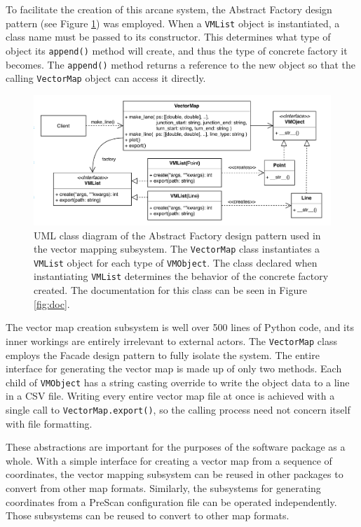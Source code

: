 \documentclass[12pt,twoside]{article}
\begin{document}
To facilitate the creation of this arcane system, the Abstract Factory design pattern (see Figure \ref{fig:factory-uml}) was employed. When a \texttt{VMList} object is instantiated, a class name must be passed to its constructor. This determines what type of object its \texttt{append()} method will create, and thus the type of concrete factory it becomes. The \texttt{append()} method returns a reference to the new object so that the calling \texttt{VectorMap} object can access it directly.

\begin{figure}[ht]
    \centering
    \includegraphics[width=16cm,keepaspectratio]{factory.png}
    \caption{UML class diagram of the Abstract Factory design pattern used in the vector mapping subsystem. The \texttt{VectorMap} class instantiates a \texttt{VMList} object for each type of \texttt{VMObject}. The class declared when instantiating \texttt{VMList} determines the behavior of the concrete factory created. The documentation for this class can be seen in Figure \ref{fig:doc}.}
    \label{fig:factory-uml}
\end{figure}

The vector map creation subsystem is well over 500 lines of Python code, and its inner workings are entirely irrelevant to external actors. The \texttt{VectorMap} class employs the Facade design pattern to fully isolate the system. The entire interface for generating the vector map is made up of only two methods. Each child of \texttt{VMObject} has a string casting override to write the object data to a line in a CSV file. Writing every entire vector map file at once is achieved with a single call to \texttt{VectorMap.export()}, so the calling process need not concern itself with file formatting.

These abstractions are important for the purposes of the software package as a whole. With a simple interface for creating a vector map from a sequence of coordinates, the vector mapping subsystem can be reused in other packages to convert from other map formats. Similarly, the subsystems for generating coordinates from a PreScan configuration file can be operated independently. Those subsystems can be reused to convert to other map formats.
\end{document}
